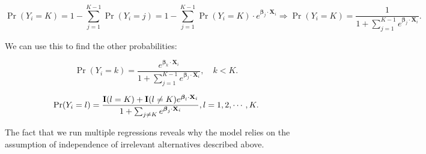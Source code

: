 \documentclass[UTF8,a4paper,10pt]{article}
\begin{document}
\begin{equation}
\Pr(Y_i=K) = 1 - \sum_{j=1}^{K-1} \Pr(Y_i=j) = 1 - \sum_{j=1}^{K-1} \Pr(Y_i=K) \cdot e^{\boldsymbol{\beta}_j \cdot \mathbf{X}_i} \Rightarrow \Pr(Y_i=K) = \frac{1}{1 + \sum_{j=1}^{K-1} e^{\boldsymbol{\beta}_j \cdot \mathbf{X}_i}}.
\end{equation}

We can use this to find the other probabilities:

\begin{equation}
\Pr(Y_i=k) = \frac{e^{\boldsymbol{\beta}_k \cdot \mathbf{X}_i}}{1 + \sum_{j=1}^{K-1} e^{\boldsymbol{\beta}_j \cdot \mathbf{X}_i}}, \quad k < K.
\end{equation}

\begin{equation}
  \Pr(Y_i=l) = \frac{\operatorname{\mathbf{I}}(l = K)+\operatorname{\mathbf{I}}(l\neq K)e^{\boldsymbol{\beta}_l \cdot \mathbf{X}_i}}{1 + \sum_{j\neq K} e^{\boldsymbol{\beta}_j \cdot \mathbf{X}_i}}, l = 1,2,\cdots,K.
  \end{equation}

The fact that we run multiple regressions reveals why the model relies on the assumption of independence of irrelevant alternatives described above.





    





\end{document}
